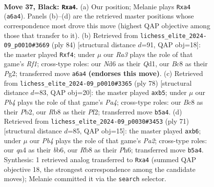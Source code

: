 \documentclass[11pt]{article}
\begin{document}
\clearpage

\begin{figure}[p]\centering
\begin{subfigure}{0.46\textwidth}\centering
\resizebox{\linewidth}{!}{%
\newchessgame
\chessboard[
  setfen={1rb2k2/7p/r2n4/1pR3p1/Q7/4P1P1/P4PKP/B3R3 b - - 0 37},
  showmover=false,
  pgfstyle=straightmove, color=movearrow, markmove={a6-a4}
]}
\caption{}
\end{subfigure}\hfill
\begin{subfigure}{0.46\textwidth}\centering
\resizebox{\linewidth}{!}{%
\newchessgame
\chessboard[
  setfen={6k1/5pp1/2Nbp3/3p4/2rP1q2/6pP/6P1/3Q1R1K w - - 4 43},
  showmover=false,
  pgfstyle=straightmove, color=movearrow, markmove={f1-f4}
]}
\caption{}
\end{subfigure}
\\[4pt]
\begin{subfigure}{0.46\textwidth}\centering
\resizebox{\linewidth}{!}{%
\newchessgame
\chessboard[
  setfen={3r2k1/5pp1/1p1P4/pq6/P6r/4B3/1P3P2/K1R5 w - - 0 40},
  showmover=false,
  pgfstyle=straightmove, color=movearrow, markmove={a4-b5}
]}
\caption{}
\end{subfigure}\hfill
\begin{subfigure}{0.46\textwidth}\centering
\resizebox{\linewidth}{!}{%
\newchessgame
\chessboard[
  setfen={3r2k1/p7/1B2n2p/5Rp1/1P6/2P3P1/3r1P1P/R4BK1 b - - 0 36},
  showmover=false,
  pgfstyle=straightmove, color=movearrow, markmove={a7-b6}
]}
\caption{}
\end{subfigure}
\caption{\textbf{Move 37, Black: \texttt{Rxa4}.} (a) Our position; Melanie plays \texttt{Rxa4} (\texttt{a6a4}). Panels (b)--(d) are the retrieved master positions whose correspondence most drove this move (highest QAP objective among those that transfer to it). (b) Retrieved from \texttt{lichess\_elite\_2024-09\_p0010\#3669} (ply 84) [structural distance $d$=91, QAP obj=18]: the master played \texttt{Rxf4}; under $\mu$ our \emph{Ra3} plays the role of that game's \emph{Rf1}; cross-type roles: our \emph{N}d6 as their \emph{Q}d1, our \emph{B}c8 as their \emph{P}g2; transferred move \texttt{a6a4} \textbf{(endorses this move)}. (c) Retrieved from \texttt{lichess\_elite\_2024-09\_p0010\#3365} (ply 78) [structural distance $d$=83, QAP obj=20]: the master played \texttt{axb5}; under $\mu$ our \emph{Pb4} plays the role of that game's \emph{Pa4}; cross-type roles: our \emph{B}c8 as their \emph{P}b2, our \emph{R}b8 as their \emph{P}f2; transferred move \texttt{b5a4}. (d) Retrieved from \texttt{lichess\_elite\_2024-09\_p0030\#3453} (ply 71) [structural distance $d$=85, QAP obj=15]: the master played \texttt{axb6}; under $\mu$ our \emph{Pb4} plays the role of that game's \emph{Pa2}; cross-type roles: our \emph{q}a4 as their \emph{b}b6, our \emph{R}b8 as their \emph{P}h6; transferred move \texttt{b5a4}. Synthesis: 1 retrieved analog transferred to \texttt{Rxa4} (summed QAP objective 18, the strongest correspondence among the candidate moves); Melanie committed it via the \texttt{search} selector.}
\label{fig:thought-m73}
\end{figure}
\end{document}
